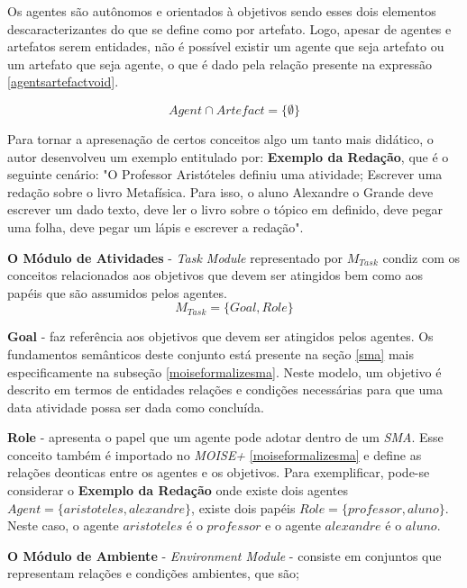 Os agentes são autônomos e orientados à objetivos sendo esses dois elementos descaracterizantes do que se define como por artefato. Logo, apesar de agentes e artefatos serem entidades, não é possível existir um agente que seja artefato ou um artefato que seja agente, o que é dado pela relação presente na expressão \ref{agentsartefactvoid}. 

\begin{equation} \label{agentsartefactvoid}
    Agent \cap Artefact = \{ \emptyset \}
\end{equation}

Para tornar a apresenação de certos conceitos algo um tanto mais didático, o autor desenvolveu um exemplo entitulado por: \textbf{Exemplo da Redação}, que é o seguinte cenário: "O Professor Aristóteles definiu uma atividade; Escrever uma redação sobre o livro Metafísica. Para isso, o aluno Alexandre o Grande deve escrever um dado texto, deve ler o livro sobre o tópico em definido, deve pegar uma folha, deve pegar um lápis e escrever a redação".  


\textbf{O Módulo de Atividades} - \textit{Task Module} representado por $M_{Task}$ condiz com os conceitos relacionados aos objetivos que devem ser atingidos bem como aos papéis que são assumidos pelos agentes.
\begin{equation}
    M_{Task} = \{ Goal, Role \}
\end{equation}

\textbf{Goal} - faz referência aos objetivos que devem ser atingidos pelos agentes. Os fundamentos semânticos deste conjunto está presente na seção \ref{sma} mais especificamente na subseção \ref{moiseformalizesma}. Neste modelo, um objetivo é descrito em termos de entidades relações e condições necessárias para que uma data atividade possa ser dada como concluída. 

\textbf{Role} - apresenta o papel que um agente pode adotar dentro de um \textit{SMA}. Esse conceito também é importado no \textit{MOISE+} 
\ref{moiseformalizesma} e define as relações deonticas entre os agentes e os objetivos. Para exemplificar, pode-se considerar o \textbf{Exemplo da Redação} onde existe dois agentes $Agent = \{ aristoteles, alexandre \}$, existe dois papéis $Role = \{ professor, aluno\}$. Neste caso, o agente $aristoteles$ é o $professor$ e o agente $alexandre$ é o $aluno$.

\textbf{O Módulo de Ambiente} - \textit{Environment Module} - consiste em conjuntos que representam relações e condições ambientes, que são;

